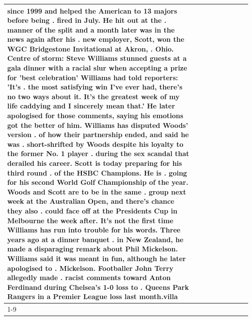 \begin{table}[H]
\begin{tabular}{lllrlllll}
since 1999 and helped the American to 13 majors before being . fired in July. He hit out at the . manner of the split and a month later was in the news again after his . new employer, Scott, won the WGC Bridgestone Invitational at Akron, . Ohio. Centre of storm: Steve Williams stunned guests at a gala dinner with a racial slur when accepting a prize for 'best celebration' Williams had told reporters: 'It's . the most satisfying win I've ever had, there's no two ways about it. It's the greatest week of my life caddying and I sincerely mean that.' He later apologised for those comments, saying his emotions got the better of him. Williams has disputed Woods' version . of how their partnership ended, and said he was . short-shrifted by Woods despite his loyalty to the former No. 1 player . during the sex scandal that derailed his career. Scott is today preparing for his third round . of the HSBC Champions. He is . going for his second World Golf Championship of the year. Woods and Scott are to be in the same . group next week at the Australian Open, and there's chance they also . could face off at the Presidents Cup in Melbourne the week after. It's not the first time Williams has run into trouble for his words. Three years ago at a dinner banquet . in New Zealand, he made a disparaging remark about Phil Mickelson. Williams said it was meant in fun, although he later apologised to . Mickelson. Footballer John Terry allegedly made . racist comments toward Anton Ferdinand during Chelsea's 1-0 loss to . Queens Park Rangers in a Premier League loss last month.villa \\
\cline{1-9}

\end{tabular}
\end{table}
